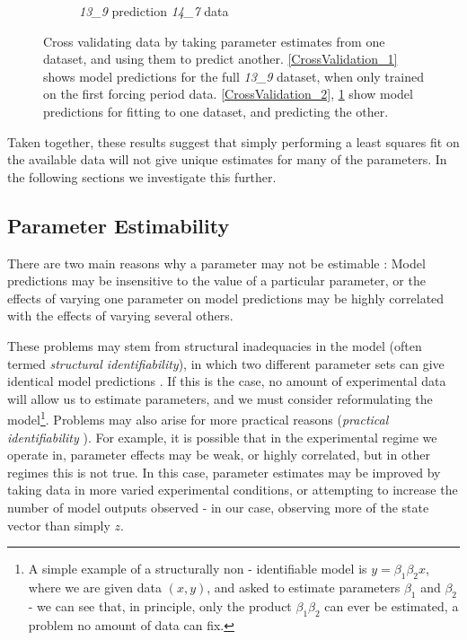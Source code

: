 \documentclass[10pt,journal]{./IEEE_latex_class/IEEEtran}
\begin{document}
\begin{figure}[h]
\begin{subfigure}[h]{0.49\textwidth}
        \caption{\textit{13\_9} prediction \textit{14\_7} data}
        \label{CrossValidation_3} 
    \end{subfigure}
    \caption{Cross validating data by taking parameter estimates from one dataset, and using them to predict another. \ref{CrossValidation_1} shows model predictions for the full \textit{13\_9} dataset, when only trained on the first forcing period data. \ref{CrossValidation_2}, \ref{CrossValidation_3} show model predictions for fitting to one dataset, and predicting the other.}
\label{CrossValidation}   
\end{figure}

 Taken together, these results suggest that simply performing a least squares fit on the available data will not give unique estimates for many of the parameters. In the following sections we investigate this further.
 
 \subsection{Parameter Estimability}
\label{Parameter Estimability}
 
 There are two main reasons why a parameter may not be estimable \cite{Mclean2012,Yao2003, Beck,Jimenez-Hornero2008,Grewal1976}: Model predictions may be insensitive to the value of a particular parameter, or the effects of varying one parameter on model predictions may be highly correlated with the effects of varying several others.
 
These problems may stem from structural inadequacies in the model (often termed \textit{structural identifiability}), in which two different parameter sets can give identical model predictions \cite{Jimenez-Hornero2008,Grewal1976 }. If this is the case, no amount of experimental data will allow us to estimate parameters, and we must consider reformulating the model\footnote{A simple example of a structurally non - identifiable model is $y = \beta_{1}\beta_{2}x$, where we are given data $(x,y)$, and asked to estimate parameters $\beta_{1}$ and $\beta_{2}$ - we can see that, in principle, only the product $\beta_{1}\beta_{2}$ can ever be estimated, a problem no amount of data can fix.}. Problems may also arise for more practical reasons (\textit{practical identifiability} \cite{Mclean2012}). For example, it is possible that in the experimental regime we operate in, parameter effects may be weak, or highly correlated, but in other regimes this is not true. In this case, parameter estimates may be improved by taking data in more varied experimental conditions, or attempting to increase the number of model outputs observed - in our case, observing more of the state vector than simply $z$. 
 
\end{document}
